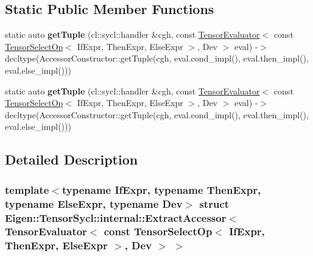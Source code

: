 \subsection*{Static Public Member Functions}
\begin{DoxyCompactItemize}
\item 
\mbox{\label{struct_eigen_1_1_tensor_sycl_1_1internal_1_1_extract_accessor_3_01_tensor_evaluator_3_01const_015fb0e3d50888e2609204b1bb14cbb286_a2cb614aaaff90e4d6c3e77778aac5cf1}} 
static auto {\bfseries get\+Tuple} (cl\+::sycl\+::handler \&cgh, const \hyperlink{struct_eigen_1_1_tensor_evaluator}{Tensor\+Evaluator}$<$ const \hyperlink{class_eigen_1_1_tensor_select_op}{Tensor\+Select\+Op}$<$ If\+Expr, Then\+Expr, Else\+Expr $>$, Dev $>$ eval) -\/$>$ decltype(Accessor\+Constructor\+::get\+Tuple(cgh, eval.\+cond\+\_\+impl(), eval.\+then\+\_\+impl(), eval.\+else\+\_\+impl()))
\item 
\mbox{\label{struct_eigen_1_1_tensor_sycl_1_1internal_1_1_extract_accessor_3_01_tensor_evaluator_3_01const_015fb0e3d50888e2609204b1bb14cbb286_a2cb614aaaff90e4d6c3e77778aac5cf1}} 
static auto {\bfseries get\+Tuple} (cl\+::sycl\+::handler \&cgh, const \hyperlink{struct_eigen_1_1_tensor_evaluator}{Tensor\+Evaluator}$<$ const \hyperlink{class_eigen_1_1_tensor_select_op}{Tensor\+Select\+Op}$<$ If\+Expr, Then\+Expr, Else\+Expr $>$, Dev $>$ eval) -\/$>$ decltype(Accessor\+Constructor\+::get\+Tuple(cgh, eval.\+cond\+\_\+impl(), eval.\+then\+\_\+impl(), eval.\+else\+\_\+impl()))
\end{DoxyCompactItemize}


\subsection{Detailed Description}
\subsubsection*{template$<$typename If\+Expr, typename Then\+Expr, typename Else\+Expr, typename Dev$>$\newline
struct Eigen\+::\+Tensor\+Sycl\+::internal\+::\+Extract\+Accessor$<$ Tensor\+Evaluator$<$ const Tensor\+Select\+Op$<$ If\+Expr, Then\+Expr, Else\+Expr $>$, Dev $>$ $>$}

